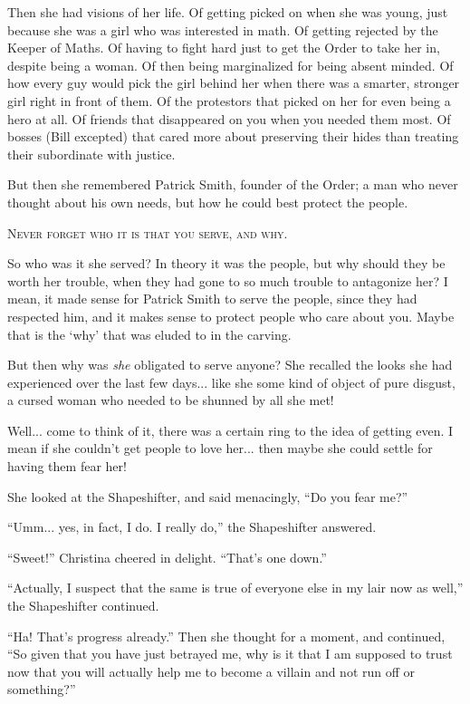 \documentclass[showtrims,b6paper,draft,10pt]{memoir}
\begin{document}
Then she had visions of her life.  Of getting picked on when she was young, just because she was a girl who was interested in math.  Of getting rejected by the Keeper of Maths.  Of having to fight hard just to get the Order to take her in, despite being a woman.  Of then being marginalized for being absent minded.  Of how every guy would pick the girl behind her when there was a smarter, stronger girl right in front of them.  Of the protestors that picked on her for even being a hero at all.  Of friends that disappeared on you when you needed them most.  Of bosses (Bill excepted) that cared more about preserving their hides than treating their subordinate with justice.

But then she remembered Patrick Smith, founder of the Order;  a man who never thought about his own needs, but how he could best protect the people.

\begin{center}
\textsc{Never forget who it is that you serve, and why.}
\end{center}

So who was it she served?  In theory it was the people, but why should they be worth her trouble, when they had gone to so much trouble to antagonize her?  I mean, it made sense for Patrick Smith to serve the people, since they had respected him, and it makes sense to protect people who care about you.  Maybe that is the `why' that was eluded to in the carving.

But then why was \emph{she} obligated to serve anyone?  She recalled the looks she had experienced over the last few days... like she some kind of object of pure disgust, a cursed woman who needed to be shunned by all she met!

Well... come to think of it, there was a certain ring to the idea of getting even.  I mean if she couldn't get people to love her... then maybe she could settle for having them fear her!

She looked at the Shapeshifter, and said menacingly, ``Do you fear me?''

``Umm... yes, in fact, I do.  I really do,'' the Shapeshifter answered.

``Sweet!'' Christina cheered in delight.  ``That's one down.''

``Actually, I suspect that the same is true of everyone else in my lair now as well,'' the Shapeshifter continued.

``Ha!  That's progress already.''  Then she thought for a moment, and continued,  ``So given that you have just betrayed me, why is it that I am supposed to trust now that you will actually help me to become a villain and not run off or something?''
\end{document}
